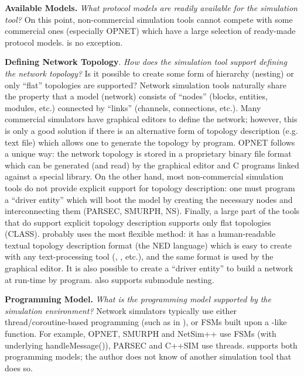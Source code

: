 \textbf{Available Models.} \textit{What protocol models are readily available
for the simulation tool?} On this point, non-commercial simulation
tools cannot compete with some commercial ones (especially OPNET)
which have a large selection of ready-made protocol models. {\opp}
is no exception.


\textbf{Defining Network Topology}. \textit{How does the simulation
  tool support defining the network topology?} Is it possible to
create some form of hierarchy (nesting) or only ``flat'' topologies
are supported? Network simulation tools naturally share the property
that a model (network) consists of ``nodes'' (blocks, entities,
modules, etc.) connected by ``links'' (channels, connections, etc.).
Many commercial simulators have graphical editors to define the
network; however, this is only a good solution if there is an
alternative form of topology description (e.g. text file) which allows
one to generate the topology by program. OPNET follows a unique way:
the network topology is stored in a proprietary binary file format
which can be generated (and read) by the graphical editor and C
programs linked against a special library. On the other hand, most
non-commercial simulation tools do not provide explicit support for
topology description: one must program a ``driver entity'' which will
boot the model by creating the necessary nodes and interconnecting
them (PARSEC, SMURPH, NS). Finally, a large part of the tools that do
support explicit topology description supports only flat topologies
(CLASS). {\opp} probably uses the most flexible method: it has a
human-readable textual topology description format (the NED language)
which is easy to create with any text-processing tool (,
, etc.), and the same format is used by the graphical
editor. It is also possible to create a ``driver entity'' to build a
network at run-time by program. {\opp} also supports submodule
nesting.


\textbf{Programming Model.} \textit{What is the programming model supported
by the simulation environment?} Network simulators typically use
either thread/coroutine-based programming (such as 
in {\opp}), or FSMs built upon a -like function.
For example, OPNET, SMURPH and NetSim++ use FSMs (with underlying
handleMessage()), PARSEC and C++SIM use threads. {\opp} supports
both programming models; the author does not know of another
simulation tool that does so.


